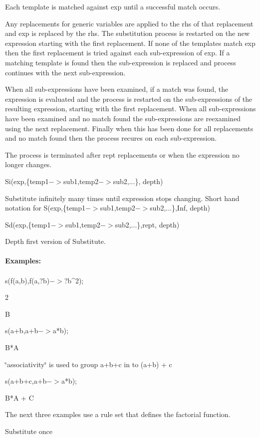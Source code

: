 Each template is matched against exp until a successful match occurs.

Any replacements for generic variables are applied to the rhs of that
replacement and exp is replaced by the rhs. The substitution process is
restarted on the new expression starting with the first replacement. If
none of the templates match exp then the first replacement is tried
against each sub-expression of exp. If a matching template is found
then the sub-expression is replaced and process continues with the next
sub-expression.

When all sub-expressions have been examined, if a match was found, the
expression is evaluated and the process is restarted on the
sub-expressions of the resulting expression, starting with the first
replacement. When all sub-expressions have been examined and no match
found the sub-expressions are reexamined using the next replacement.
Finally when this has been done for all replacements and no match found
then the process recures on each sub-expression.


The process is terminated after rept replacements or when the expression
no longer changes.



Si(exp,\{temp1$->$sub1,temp2$->$sub2,...\}, depth)


Substitute infinitely many times until expression stops changing.
Short hand notation for S(exp,\{temp1$->$sub1,temp2$->$sub2,...\},Inf,
depth)


Sd(exp,\{temp1$->$sub1,temp2$->$sub2,...\},rept, depth)


Depth first version of Substitute.\\
\ \\
{\bf Examples:} \\
\ \\
 s(f(a,b),f(a,?b)$->$?b\^{}2);

 2

 B



 s(a+b,a+b$->$a{*}b);

 B{*}A



 \char`\"{}associativity\char`\"{} is used to group a+b+c in to (a+b)
+ c

 s(a+b+c,a+b$->$a{*}b);

 B{*}A + C


The next three examples use a rule set that defines the factorial function.

Substitute once

